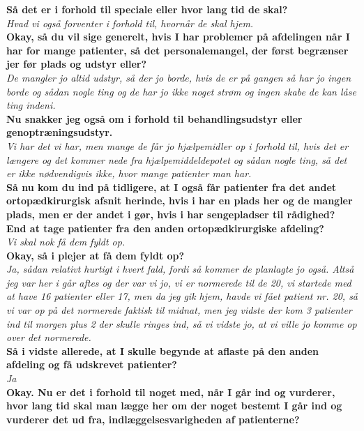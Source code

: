 \noindent
\textbf{Så det er i forhold til speciale eller hvor lang tid de skal?} \\
\noindent
\textit{ Hvad vi også forventer i forhold til, hvornår de skal hjem.} \\
\noindent
\textbf{Okay, så du vil sige generelt, hvis I har problemer på afdelingen når I har for mange patienter, så det personalemangel, der først begrænser jer før plads og udstyr eller?} \\
\noindent
\textit{De mangler jo altid udstyr, så der jo borde, hvis de er på gangen så har jo ingen borde og sådan nogle ting og de har jo ikke noget strøm og ingen skabe de kan låse ting indeni.} \\
\noindent
\textbf{ Nu snakker jeg også om i forhold til behandlingsudstyr eller genoptræningsudstyr.} \\
\noindent
\textit{Vi har det vi har, men mange de får jo hjælpemidler op i forhold til, hvis det er længere og det kommer nede fra hjælpemiddeldepotet og sådan nogle ting, så det er ikke nødvendigvis ikke, hvor mange patienter man har. } \\
\noindent
\textbf{Så nu kom du ind på tidligere, at I også får patienter fra det andet ortopædkirurgisk afsnit herinde, hvis i har en plads her og de mangler plads, men er der andet i gør, hvis i har sengepladser til rådighed? End at tage patienter fra den anden ortopædkirurgiske afdeling? } \\
\noindent
\textit{Vi skal nok få dem fyldt op. } \\
\noindent
\textbf{Okay, så i plejer at få dem fyldt op? } \\
\noindent
\textit{Ja, sådan relativt hurtigt i hvert fald, fordi så kommer de planlagte jo også. Altså jeg var her i går aftes og der var vi jo, vi er normerede til de 20, vi startede med at have 16 patienter eller 17, men da jeg gik hjem, havde vi fået patient nr. 20, så vi var op på det normerede faktisk til midnat, men jeg vidste der kom 3 patienter ind til morgen plus 2 der skulle ringes ind, så vi vidste jo, at vi ville jo komme op over det normerede.} \\
\noindent
\textbf{Så i vidste allerede, at I skulle begynde at aflaste på den anden afdeling og få udskrevet patienter?} \\
\noindent
\textit{Ja} \\
\noindent
\textbf{Okay. Nu er det i forhold til noget med, når I går ind og vurderer, hvor lang tid skal man lægge her om der noget bestemt I går ind og vurderer det ud fra, indlæggelsesvarigheden af patienterne?} \\

